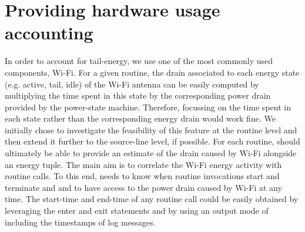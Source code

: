 \section{Providing hardware usage accounting}
\label{sec:hw}


In order to account for tail-energy, we use one of the most commonly 
used components, Wi-Fi. For a given routine, the drain associated to 
each energy state (e.g. active, tail, idle) of the Wi-Fi antenna can be 
easily computed by multiplying the time spent in this state by the 
corresponding power drain provided by the power-state machine. 
Therefore, focussing on the time spent in each state rather than the 
corresponding energy drain would work fine. We initially chose to 
investigate the feasibility of this feature at the routine level and 
then extend it further to the source-line level, if possible. For each 
routine, \Orka{} should ultimately be able to provide an estimate of the 
drain caused by Wi-Fi alongside an energy tuple. The main aim is to 
correlate the Wi-Fi energy activity with routine calls. To this end, 
\Orka{} needs to know when routine invocations start and terminate and 
and to have access to the power drain caused by Wi-Fi at any time. The 
start-time and end-time of any routine call could be easily obtained by 
leveraging the \logcat{} enter and exit statements and by using an 
output mode of \logcat{} including the timestamps of log messages.

